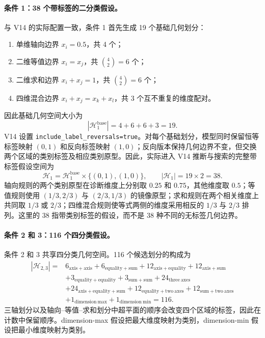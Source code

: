 \paragraph{条件 1：38 个带标签的二分类假设。}
与 V14 的实际配置一致，条件 1 首先生成 19 个基础几何划分：
\begin{enumerate}
    \item 单维轴向边界 $x_i=0.5$，共 4 个；
    \item 二维等值边界 $x_i=x_j$，共 $\binom{4}{2}=6$ 个；
    \item 二维求和边界 $x_i+x_j=1$，共 $\binom{4}{2}=6$ 个；
    \item 四维混合边界 $x_i+x_j=x_k+x_l$，共 3 个互不重复的维度配对。
\end{enumerate}
因此基础几何空间大小为
\begin{equation}
    |\mathcal H_1^{\mathrm{base}}|=4+6+6+3=19 .
    \label{eq:modelv2-cond1-count}
\end{equation}
V14 设置 \texttt{include\_label\_reversals=true}。对每个基础划分，模型同时保留恒等标签映射 $(0,1)$ 和反向标签映射 $(1,0)$；反向版本保持几何边界不变，但交换两个区域的类别标签及相应类别原型。因此，实际进入 V14 推断与搜索的完整带标签假设空间为
\begin{equation}
    \mathcal H_1
    =
    \mathcal H_1^{\mathrm{base}}
    \times
    \{(0,1),(1,0)\},
    \qquad
    |\mathcal H_1|=19\times2=38 .
    \label{eq:modelv2-cond1-labelled-count}
\end{equation}
轴向规则的两个类别原型在诊断维度上分别取 $0.25$ 和 $0.75$，其他维度取 $0.5$；等值规则使用 $(1/3,2/3)$ 与 $(2/3,1/3)$ 的镜像原型；求和规则在两个相关维度上共同取 $1/3$ 或 $2/3$；四维混合规则使等式两侧的维度采用相反的 $1/3$ 与 $2/3$ 排列。这里的 38 指带类别标签的假设，而不是 38 种不同的无标签几何边界。

\paragraph{条件 2 和 3：116 个四分类假设。}
条件 2 和 3 共享四分类几何空间。116 个候选划分的构成为
\begin{equation}
\begin{aligned}
    |\mathcal H_{2,3}|
    ={}&
    6_{\mathrm{axis+axis}}
    +6_{\mathrm{equality+sum}}
    +12_{\mathrm{axis+equality}}
    +12_{\mathrm{axis+sum}}\\
    &+3_{\mathrm{equality+equality}}
    +3_{\mathrm{sum+sum}}
    +24_{\mathrm{three\ axes}}\\
    &+24_{\mathrm{axis+equality+sum}}
    +12_{\mathrm{equality+two\ axes}}
    +12_{\mathrm{sum+two\ axes}}\\
    &+1_{\mathrm{dimension\ max}}
    +1_{\mathrm{dimension\ min}}
    =116 .
    \label{eq:modelv2-cond23-count}
\end{aligned}
\end{equation}
三轴划分以及轴向--等值--求和划分中超平面的顺序会改变四个区域的标签，因此在计数中保留顺序。dimension-max 假设把最大维度映射为类别，dimension-min 假设把最小维度映射为类别。

